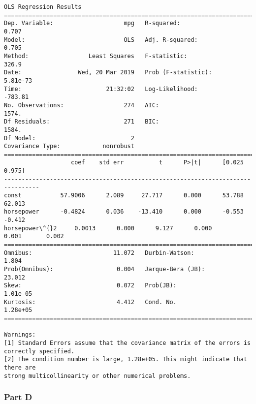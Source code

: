 \documentclass[11pt]{article}
\begin{document}
    \begin{Verbatim}[commandchars=\\\{\}]
                            OLS Regression Results                            
==============================================================================
Dep. Variable:                    mpg   R-squared:                       0.707
Model:                            OLS   Adj. R-squared:                  0.705
Method:                 Least Squares   F-statistic:                     326.9
Date:                Wed, 20 Mar 2019   Prob (F-statistic):           5.81e-73
Time:                        21:32:02   Log-Likelihood:                -783.81
No. Observations:                 274   AIC:                             1574.
Df Residuals:                     271   BIC:                             1584.
Df Model:                           2                                         
Covariance Type:            nonrobust                                         
================================================================================
                   coef    std err          t      P>|t|      [0.025      0.975]
--------------------------------------------------------------------------------
const           57.9006      2.089     27.717      0.000      53.788      62.013
horsepower      -0.4824      0.036    -13.410      0.000      -0.553      -0.412
horsepower\^{}2     0.0013      0.000      9.127      0.000       0.001       0.002
==============================================================================
Omnibus:                       11.072   Durbin-Watson:                   1.804
Prob(Omnibus):                  0.004   Jarque-Bera (JB):               23.012
Skew:                           0.072   Prob(JB):                     1.01e-05
Kurtosis:                       4.412   Cond. No.                     1.28e+05
==============================================================================

Warnings:
[1] Standard Errors assume that the covariance matrix of the errors is correctly specified.
[2] The condition number is large, 1.28e+05. This might indicate that there are
strong multicollinearity or other numerical problems.

    \end{Verbatim}

    \subsubsection*{Part D}\label{part-d}
\end{document}
